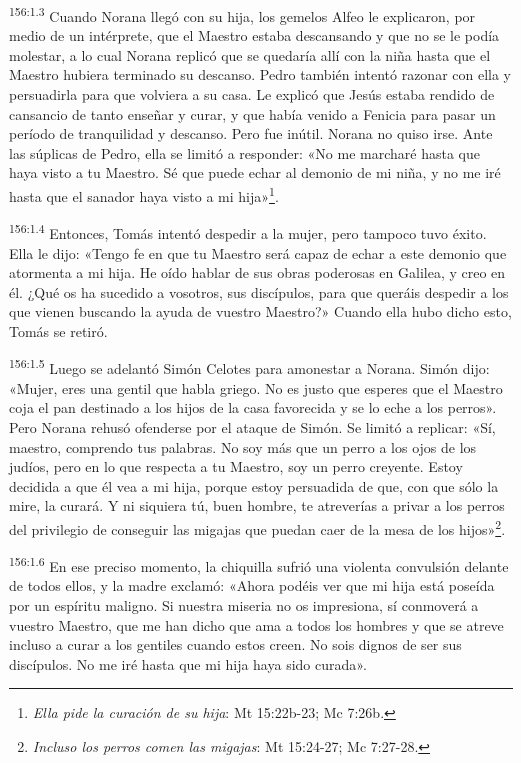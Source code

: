 \par
\textsuperscript{156:1.3} Cuando Norana llegó con su hija, los gemelos Alfeo le explicaron, por medio de un intérprete, que el Maestro estaba descansando y que no se le podía molestar, a lo cual Norana replicó que se quedaría allí con la niña hasta que el Maestro hubiera terminado su descanso. Pedro también intentó razonar con ella y persuadirla para que volviera a su casa. Le explicó que Jesús estaba rendido de cansancio de tanto enseñar y curar, y que había venido a Fenicia para pasar un período de tranquilidad y descanso. Pero fue inútil. Norana no quiso irse. Ante las súplicas de Pedro, ella se limitó a responder: «No me marcharé hasta que haya visto a tu Maestro. Sé que puede echar al demonio de mi niña, y no me iré hasta que el sanador haya visto a mi hija»\footnote{\textit{Ella pide la curación de su hija}: Mt 15:22b-23; Mc 7:26b.}.

\par
\textsuperscript{156:1.4} Entonces, Tomás intentó despedir a la mujer, pero tampoco tuvo éxito. Ella le dijo: «Tengo fe en que tu Maestro será capaz de echar a este demonio que atormenta a mi hija. He oído hablar de sus obras poderosas en Galilea, y creo en él. ¿Qué os ha sucedido a vosotros, sus discípulos, para que queráis despedir a los que vienen buscando la ayuda de vuestro Maestro?» Cuando ella hubo dicho esto, Tomás se retiró.

\par
\textsuperscript{156:1.5} Luego se adelantó Simón Celotes para amonestar a Norana. Simón dijo: «Mujer, eres una gentil que habla griego. No es justo que esperes que el Maestro coja el pan destinado a los hijos de la casa favorecida y se lo eche a los perros». Pero Norana rehusó ofenderse por el ataque de Simón. Se limitó a replicar: «Sí, maestro, comprendo tus palabras. No soy más que un perro a los ojos de los judíos, pero en lo que respecta a tu Maestro, soy un perro creyente. Estoy decidida a que él vea a mi hija, porque estoy persuadida de que, con que sólo la mire, la curará. Y ni siquiera tú, buen hombre, te atreverías a privar a los perros del privilegio de conseguir las migajas que puedan caer de la mesa de los hijos»\footnote{\textit{Incluso los perros comen las migajas}: Mt 15:24-27; Mc 7:27-28.}.

\par
\textsuperscript{156:1.6} En ese preciso momento, la chiquilla sufrió una violenta convulsión delante de todos ellos, y la madre exclamó: «Ahora podéis ver que mi hija está poseída por un espíritu maligno. Si nuestra miseria no os impresiona, sí conmoverá a vuestro Maestro, que me han dicho que ama a todos los hombres y que se atreve incluso a curar a los gentiles cuando estos creen. No sois dignos de ser sus discípulos. No me iré hasta que mi hija haya sido curada».

